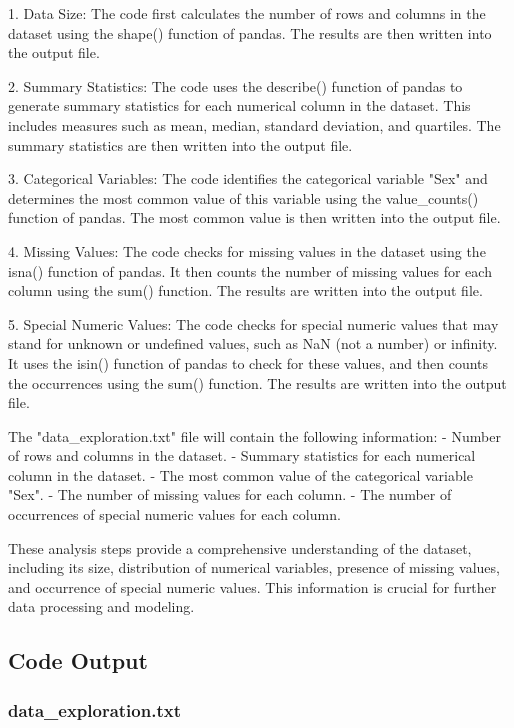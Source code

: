 \documentclass[11pt]{article}
\begin{document}
1. Data Size: The code first calculates the number of rows and columns in the dataset using the shape() function of pandas. The results are then written into the output file.

2. Summary Statistics: The code uses the describe() function of pandas to generate summary statistics for each numerical column in the dataset. This includes measures such as mean, median, standard deviation, and quartiles. The summary statistics are then written into the output file.

3. Categorical Variables: The code identifies the categorical variable "Sex" and determines the most common value of this variable using the value\_counts() function of pandas. The most common value is then written into the output file.

4. Missing Values: The code checks for missing values in the dataset using the isna() function of pandas. It then counts the number of missing values for each column using the sum() function. The results are written into the output file.

5. Special Numeric Values: The code checks for special numeric values that may stand for unknown or undefined values, such as NaN (not a number) or infinity. It uses the isin() function of pandas to check for these values, and then counts the occurrences using the sum() function. The results are written into the output file.

The "data\_exploration.txt" file will contain the following information:
- Number of rows and columns in the dataset.
- Summary statistics for each numerical column in the dataset.
- The most common value of the categorical variable "Sex".
- The number of missing values for each column.
- The number of occurrences of special numeric values for each column.

These analysis steps provide a comprehensive understanding of the dataset, including its size, distribution of numerical variables, presence of missing values, and occurrence of special numeric values. This information is crucial for further data processing and modeling.

\subsection{Code Output}

\subsubsection*{data\_exploration.txt}
\end{document}
